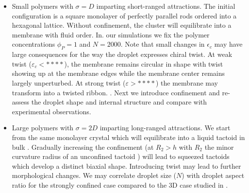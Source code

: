 \begin{itemize}
\item  Small polymers with $\sigma = D$ imparting short-ranged attractions. The initial configuration is a square monolayer of perfectly parallel rods ordered into a hexagonal lattice. Without confinement, the cluster will equilibrate into a membrane with  fluid order. In. our simulations we fix the polymer concentrations $\phi_{P}=1$ and $N=2000$. Note that small changes in $\epsilon_{c}$ may have large consequences for the way the droplet expresses chiral twist. At weak twist ($\varepsilon_{c} < ****$), the membrane remains circular in shape with twist showing up at the membrane edges while the membrane center remains largely unperturbed. At strong twist ($\varepsilon > ****$) the membrane may transform into a twisted ribbon. .  Next we introduce confinement and re-assess the droplet shape and internal structure and compare with experimental observations.

\item Large polymers with $\sigma = 2 D$ imparting long-ranged attractions. We start from the same monolayer crystal which will equilibrate into a liquid tactoid in bulk \cite{kuhnhold2022structure}. Gradually increasing the confinement (at $R_{2} > h$ with $R_{2}$ the minor curvature radius of an unconfined tactoid \cite{kuhnhold2022structure})  will lead to squeezed tactoids which  develop a distinct biaxial shape. Introducing twist may lead to further morphological changes. We may correlate droplet size ($N$) with droplet aspect ratio for the strongly confined case compared to the 3D case studied in \cite{kuhnhold2022structure}.

\end{itemize}

